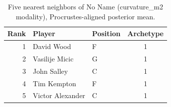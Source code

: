 \begin{table}[htbp]
  \centering\small
  \begin{tabular}{rllc}
    \toprule
    Rank & Player & Position & Archetype \\
    \midrule
    1 & David Wood & F & 1 \\
    2 & Vasilije Micic & G & 1 \\
    3 & John Salley & C & 1 \\
    4 & Tim Kempton & F & 1 \\
    5 & Victor Alexander & C & 1 \\
    \bottomrule
  \end{tabular}
  \caption{Five nearest neighbors of No Name (curvature_m2 modality), Procrustes-aligned posterior mean.}
  \label{tab:No_Name_neighbors_curvature_m2}
\end{table}

